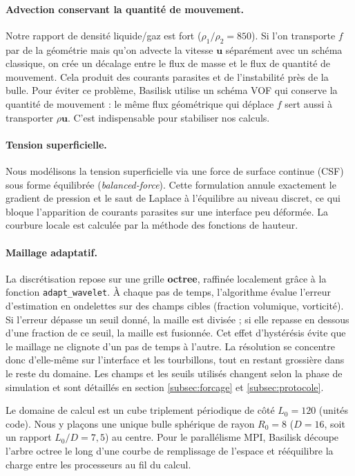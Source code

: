 \paragraph{Advection conservant la quantité de mouvement.} Notre rapport de densité liquide/gaz est fort ($\rho_1/\rho_2 = 850$). Si l'on transporte $f$ par de la géométrie mais qu'on advecte la vitesse $\mathbf{u}$ séparément avec un schéma classique, on crée un décalage entre le flux de masse et le flux de quantité de mouvement. Cela produit des courants parasites et de l'instabilité près de la bulle. Pour éviter ce problème, Basilisk utilise un schéma VOF qui conserve la quantité de mouvement \cite{popinet2009} : le même flux géométrique qui déplace $f$ sert aussi à transporter $\rho\mathbf{u}$. C'est indispensable pour stabiliser nos calculs.

\paragraph{Tension superficielle.} Nous modélisons la tension superficielle via une force de surface continue (CSF) sous forme équilibrée (\emph{balanced-force}). Cette formulation annule exactement le gradient de pression et le saut de Laplace à l'équilibre au niveau discret, ce qui bloque l'apparition de courants parasites sur une interface peu déformée. La courbure locale est calculée par la méthode des fonctions de hauteur.

\paragraph{Maillage adaptatif.} La discrétisation repose sur une grille \textbf{octree}, raffinée localement grâce à la fonction \texttt{adapt\_wavelet}. À chaque pas de temps, l'algorithme évalue l'erreur d'estimation en ondelettes sur des champs cibles (fraction volumique, vorticité). Si l'erreur dépasse un seuil donné, la maille est divisée ; si elle repasse en dessous d'une fraction de ce seuil, la maille est fusionnée. Cet effet d'hystérésis évite que le maillage ne clignote d'un pas de temps à l'autre. La résolution se concentre donc d'elle-même sur l'interface et les tourbillons, tout en restant grossière dans le reste du domaine. Les champs et les seuils utilisés changent selon la phase de simulation et sont détaillés en section \ref{subsec:forcage} et \ref{subsec:protocole}.

Le domaine de calcul est un cube triplement périodique de côté $L_0 = 120$ (unités code). Nous y plaçons une unique bulle sphérique de rayon $R_0 = 8$ ($D=16$, soit un rapport $L_0/D = 7{,}5$) au centre. Pour le parallélisme MPI, Basilisk découpe l'arbre octree le long d'une courbe de remplissage de l'espace et rééquilibre la charge entre les processeurs au fil du calcul.

